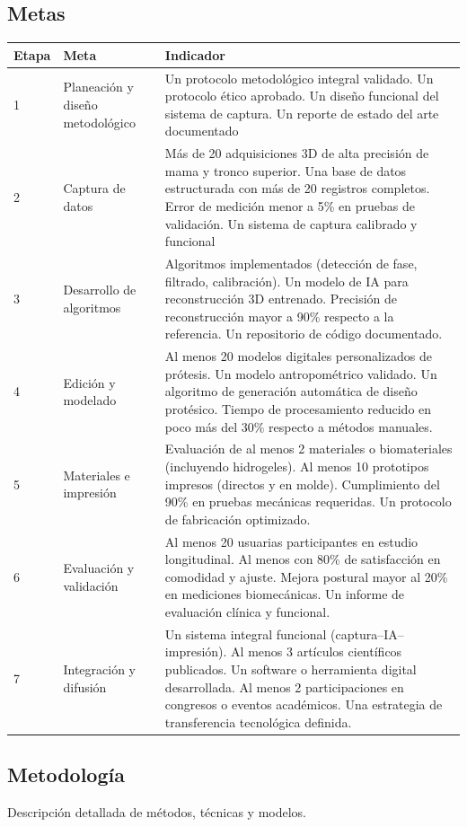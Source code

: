 \documentclass[12pt,a4paper]{article}
\begin{document}
\subsection{Metas}
\begin{longtable}{p{1cm} p{4cm} p{10cm}}
\toprule
Etapa & Meta & Indicador \\
\midrule
1 & Planeación y diseño metodológico & Un protocolo metodológico integral validado. Un protocolo ético aprobado. Un diseño funcional del sistema de captura. Un reporte de estado del arte documentado \\
2 & Captura de datos & Más de 20 adquisiciones 3D de alta precisión de mama y tronco superior. Una base de datos estructurada con más de 20 registros completos. Error de medición menor a 5\% en pruebas de validación. Un sistema de captura calibrado y funcional \\
3 & Desarrollo de algoritmos & Algoritmos implementados (detección de fase, filtrado, calibración). Un modelo de IA para reconstrucción 3D entrenado. Precisión de reconstrucción mayor a 90\% respecto a la referencia. Un repositorio de código documentado. \\
4 & Edición y modelado & Al menos 20 modelos digitales personalizados de prótesis. Un modelo antropométrico validado. Un algoritmo de generación automática de diseño protésico. Tiempo de procesamiento reducido en poco más del 30\% respecto a métodos manuales. \\
5 & Materiales e impresión & Evaluación de al menos 2 materiales o biomateriales (incluyendo hidrogeles). Al menos 10 prototipos impresos (directos y en molde). Cumplimiento del 90\% en pruebas mecánicas requeridas. Un protocolo de fabricación optimizado. \\
6 & Evaluación y validación & Al menos 20 usuarias participantes en estudio longitudinal. Al menos con 80\% de satisfacción en comodidad y ajuste. Mejora postural mayor al 20\% en mediciones biomecánicas. Un informe de evaluación clínica y funcional. \\
7 & Integración y difusión & Un sistema integral funcional (captura–IA–impresión). Al menos 3 artículos científicos publicados. Un software o herramienta digital desarrollada. Al menos 2 participaciones en congresos o eventos académicos. Una estrategia de transferencia tecnológica definida. \\
\bottomrule
\end{longtable}

\subsection{Metodología}
Descripción detallada de métodos, técnicas y modelos.
\end{document}
